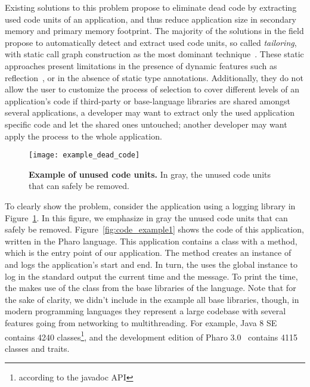Existing solutions to this problem propose to eliminate dead code by extracting used code units of an application, and thus reduce application size in secondary memory and primary memory footprint. The majority of the solutions in the field propose to automatically detect and extract used code units, so called \emph{tailoring}, with static call graph construction as the most dominant technique~\cite{Grov97a}. 
These static approaches present limitations in the presence of dynamic features such as reflection~\cite{Livs05a}, or in the absence of static type annotations. Additionally, they do not allow the user to customize the process of selection to cover different levels of an application's code \ie if third-party or base-language libraries are shared amongst several applications, a developer may want to extract only the used application specific code and let the shared ones untouched; another developer may want apply the process to the whole application.



\begin{figure}[ht]
\begin{center}
\texttt{[image: example\_dead\_code]}
\caption{\small\textbf{Example of unused code units.} In gray, the unused code units that can safely be removed.\label{fig:example_dead_code}}
\end{center}
\end{figure}

To clearly show the problem, consider the application using a logging library in Figure~\ref{fig:example_dead_code}. In this figure, we emphasize in gray the unused code units that can safely be removed. Figure~\ref{fig:code_example1} shows the code of this application, written in the Pharo language. This application contains a  class with a  method, which is the entry point of our application. The  method creates an instance of  and logs the application's start and end. In turn, the  uses the  global instance to log in the standard output the current time and the message. To print the time, the  makes use of the  class from the base libraries of the language. Note that for the sake of clarity, we didn't include in the example all base libraries, though, in modern programming languages they represent a large codebase with several features going from networking to multithreading. For example, Java 8 SE contains 4240 classes\footnote{according to the javadoc API}, and the development edition of Pharo 3.0~\cite{Blac09a} contains 4115 classes and traits.

